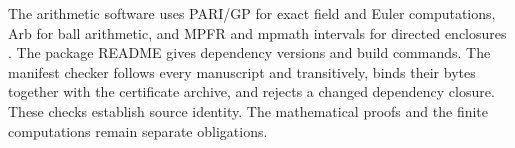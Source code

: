 The arithmetic software uses PARI/GP for exact field and Euler
computations, Arb for ball arithmetic, and MPFR and mpmath intervals for
directed enclosures \cite{PARI,Johansson2017,MPFR,Mpmath}.
The package README gives dependency versions and build commands.
The manifest checker follows every manuscript \verb|| and
\verb|| transitively, binds their bytes together with the
certificate archive, and rejects a changed dependency closure. These
checks establish source identity. The mathematical proofs and the
finite computations remain separate obligations.

